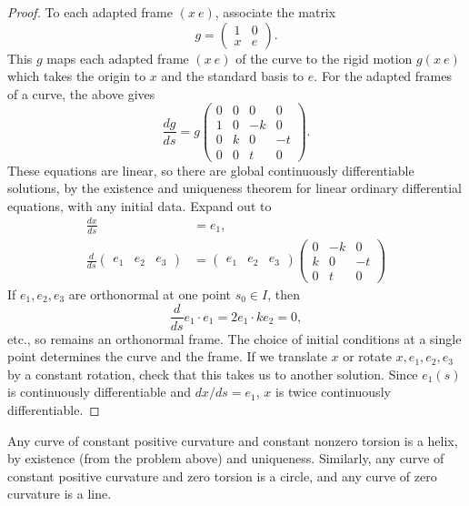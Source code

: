 \begin{proof}
To each adapted frame \((x \ e)\), associate the matrix
\[
g=
\begin{pmatrix}
1 & 0 \\
x & e
\end{pmatrix}.
\]
This \(g\) maps each adapted frame \((x \ e)\) of the curve to the rigid motion \(g(x \ e)\) which takes the origin to \(x\) and the standard basis to \(e\).
For the adapted frames of a curve, the above gives
\[
\frac{dg}{ds} = 
g
\begin{pmatrix}
0 & 0 & 0 & 0 \\
1 & 0 & -k & 0 \\
0 & k & 0 & -t \\
0 & 0 & t & 0
\end{pmatrix}.
\]
These equations are linear, so there are global continuously differentiable solutions, by the existence and uniqueness theorem for linear ordinary differential equations, with any initial data.
Expand out to
\begin{align*}
\frac{dx}{ds} &= e_1, \\
\frac{d}{ds}
\begin{pmatrix}
e_1 & e_2 & e_3
\end{pmatrix}
&=
\begin{pmatrix}
e_1 & e_2 & e_3
\end{pmatrix}
\begin{pmatrix}
0 & -k & 0 \\
k & 0 & -t \\
0 & t & 0
\end{pmatrix}
\end{align*}
If \(e_1, e_2, e_3\) are orthonormal at one point \(s_0 \in I\), then
\[
\frac{d}{ds} e_1 \cdot e_1
=
2 e_1 \cdot k e_2 = 0,
\]
etc., so remains an orthonormal frame.
The choice of initial conditions at a single point determines the curve and the frame.
If we translate \(x\) or rotate \(x,e_1,e_2,e_3\) by a constant rotation, check that this takes us to another solution.
Since \(e_1(s)\) is continuously differentiable and \(dx/ds=e_1\), \(x\) is twice continuously differentiable. 
\end{proof}
\begin{example} 
Any curve of constant positive curvature and constant nonzero torsion is a helix, by existence (from the problem above) and uniqueness.
Similarly, any curve of constant positive curvature and zero torsion is a circle, and any curve of zero curvature is a line.
\end{example}
